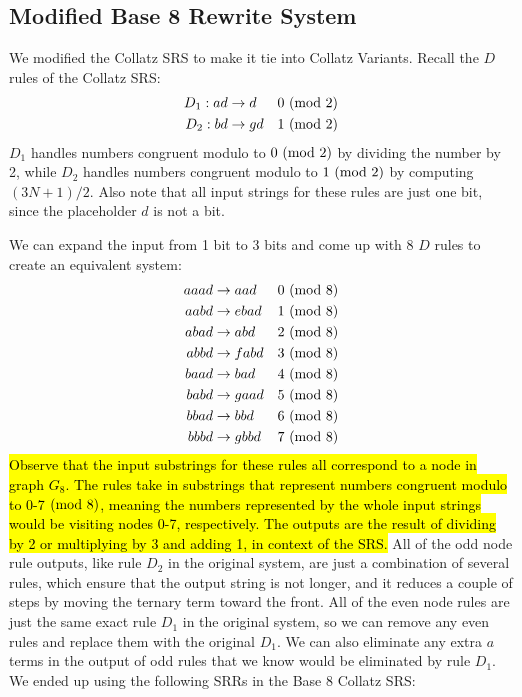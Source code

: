 \subsection{Modified Base 8 Rewrite System} \label{subsec:base8rewrite}
We modified the Collatz SRS to make it tie into Collatz Variants. Recall the $D$ rules of the Collatz SRS:
\begin{align*}
    D_1: ad &\rightarrow d &\text{$0\ (\mathrm{mod}\ 2)$}\\
    D_2: bd &\rightarrow gd &\text{$1\ (\mathrm{mod}\ 2)$}\\
\end{align*}
$D_1$ handles numbers congruent modulo to $0 \ (\mathrm{mod}\ 2)$ by dividing the number by 2, while $D_2$ handles numbers congruent modulo to $1 \ (\mathrm{mod}\ 2)$  by computing $(3N+1)/2$. Also note that all input strings for these rules are just one bit, since the placeholder $d$ is not a bit.\par
We can expand the input from 1 bit to 3 bits and come up with 8 $D$ rules to create an equivalent system:
\begin{align*}
    aaad &\rightarrow aad &\text{$0\ (\mathrm{mod}\ 8)$}\\
    aabd &\rightarrow ebad &\text{$1\ (\mathrm{mod}\ 8)$}\\
    abad &\rightarrow abd &\text{$2\ (\mathrm{mod}\ 8)$}\\
    abbd &\rightarrow fabd &\text{$3\ (\mathrm{mod}\ 8)$}\\
    baad &\rightarrow bad &\text{$4\ (\mathrm{mod}\ 8)$}\\
    babd &\rightarrow gaad &\text{$5\ (\mathrm{mod}\ 8)$}\\
    bbad &\rightarrow bbd &\text{$6\ (\mathrm{mod}\ 8)$}\\
    bbbd &\rightarrow gbbd &\text{$7\ (\mathrm{mod}\ 8)$}
\end{align*}
\hl{Observe that the input substrings for these rules all correspond to a node in graph $G_8$. The rules take in substrings that represent numbers congruent modulo to 0-7$\ (\mathrm{mod}\ 8)$, meaning the numbers represented by the whole input strings would be visiting nodes 0-7, respectively. The outputs are the result of dividing by 2 or multiplying by 3 and adding 1, in context of the SRS.} All of the odd node rule outputs, like rule $D_2$ in the original system, are just a combination of several rules, which ensure that the output string is not longer, and it reduces a couple of steps by moving the ternary term toward the front. All of the even node rules are just the same exact rule $D_1$ in the original system, so we can remove any even rules and replace them with the original $D_1$. We can also eliminate any extra $a$ terms in the output of odd rules that we know would be eliminated by rule $D_1$. We ended up using the following SRRs in the Base 8 Collatz SRS:
